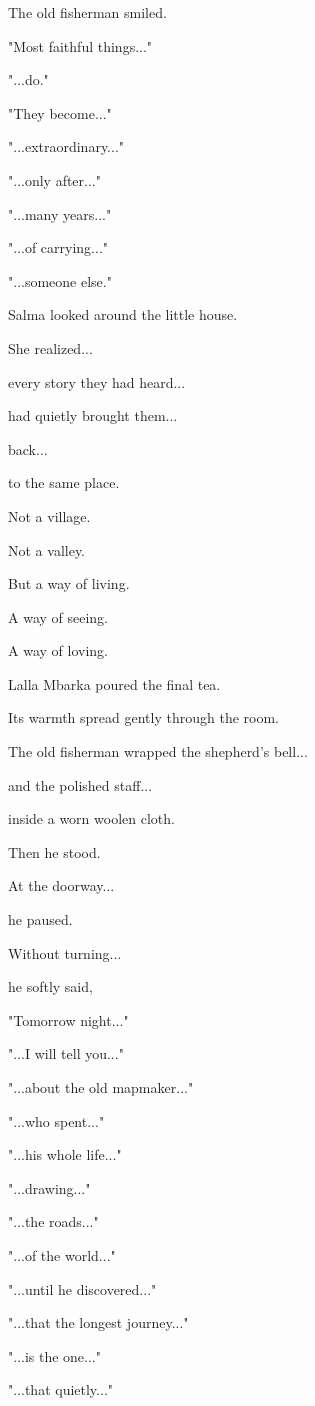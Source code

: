 \documentclass[12pt,openany]{book}
\begin{document}
The old fisherman smiled.

"Most faithful things..."

"...do."

"They become..."

"...extraordinary..."

"...only after..."

"...many years..."

"...of carrying..."

"...someone else."

Salma looked around the little house.

She realized...

every story they had heard...

had quietly brought them...

back...

to the same place.

Not a village.

Not a valley.

But a way of living.

A way of seeing.

A way of loving.

Lalla Mbarka poured the final tea.

Its warmth spread gently through the room.

The old fisherman wrapped the shepherd's bell...

and the polished staff...

inside a worn woolen cloth.

Then he stood.

At the doorway...

he paused.

Without turning...

he softly said,

"Tomorrow night..."

"...I will tell you..."

"...about the old mapmaker..."

"...who spent..."

"...his whole life..."

"...drawing..."

"...the roads..."

"...of the world..."

"...until he discovered..."

"...that the longest journey..."

"...is the one..."

"...that quietly..."
\end{document}
